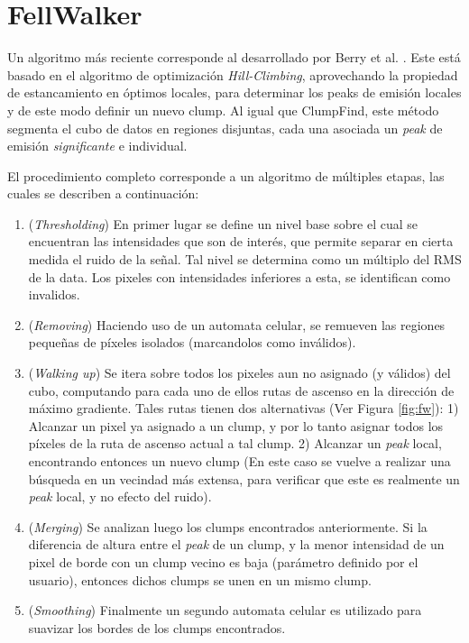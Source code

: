 \section{FellWalker}
Un algoritmo más reciente corresponde al desarrollado por Berry et al. \cite{Berry}. Este está basado en el algoritmo de optimización \textit{Hill-Climbing}, aprovechando la propiedad de estancamiento en óptimos locales, para determinar los peaks de emisión locales y de este modo definir un nuevo clump. Al igual que ClumpFind, este método segmenta el cubo de datos en regiones disjuntas, cada una asociada un \textit{peak} de emisión \textit{significante} e individual.

El procedimiento completo corresponde a un algoritmo de múltiples etapas, las cuales se describen a continuación:
\begin{enumerate}
     \item (\textit{Thresholding}) En primer lugar se define un nivel base sobre el cual se encuentran las intensidades que son de interés, que permite separar en cierta medida el ruido de la señal. Tal nivel se determina como un múltiplo del RMS de la data. Los pixeles con intensidades inferiores a esta, se identifican como invalidos.
     \item (\textit{Removing}) Haciendo uso de un automata celular, se remueven las regiones pequeñas de píxeles isolados (marcandolos como inválidos).
     \item (\textit{Walking up}) Se itera sobre todos los pixeles aun no asignado (y válidos) del cubo, computando para cada uno de ellos rutas de ascenso en la dirección de máximo gradiente. Tales rutas tienen dos alternativas (Ver Figura \ref{fig:fw}): 1) Alcanzar un pixel ya asignado a un clump, y por lo tanto asignar todos los píxeles de la ruta de ascenso actual a tal clump. 2) Alcanzar un \textit{peak} local, encontrando entonces un nuevo clump (En este caso se vuelve a realizar una búsqueda en un vecindad más extensa, para verificar que este es realmente un \textit{peak} local, y no efecto del ruido).
     \item (\textit{Merging}) Se analizan luego los clumps encontrados anteriormente. Si la diferencia de altura entre el \textit{peak} de un clump, y la menor intensidad de un pixel de borde con un clump vecino es baja (parámetro definido por el usuario), entonces dichos clumps se unen en un mismo clump.
     \item (\textit{Smoothing}) Finalmente un segundo automata celular es utilizado para suavizar los bordes de los clumps encontrados.
\end{enumerate}

